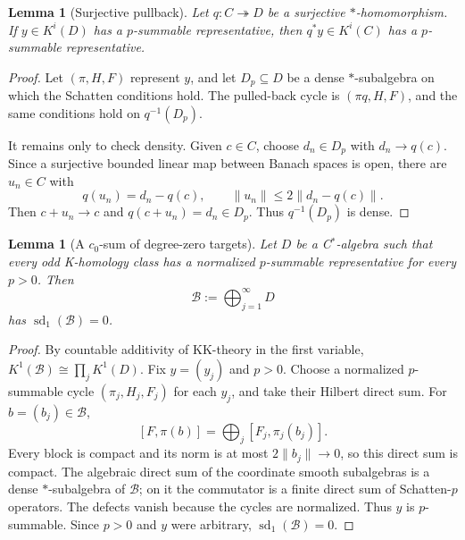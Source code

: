 \documentclass[11pt]{article}
\newtheorem{lemma}[theorem]{Lemma}
\newcommand{\sd}{\operatorname{sd}}
\newcommand{\cB}{\mathcal B}
\begin{document}
\begin{lemma}[Surjective pullback]\label{lem:surj}
Let $q:C\twoheadrightarrow D$ be a surjective $*$-homomorphism.  If
$y\in K^i(D)$ has a $p$-summable representative, then $q^*y\in K^i(C)$ has a
$p$-summable representative.
\end{lemma}

\begin{proof}
Let $(\pi,H,F)$ represent $y$, and let $D_p\subseteq D$ be a dense
$*$-subalgebra on which the Schatten conditions hold.  The pulled-back cycle
is $(\pi q,H,F)$, and the same conditions hold on $q^{-1}(D_p)$.

It remains only to check density.  Given $c\in C$, choose $d_n\in D_p$ with
$d_n\to q(c)$.  Since a surjective bounded linear map between Banach spaces
is open, there are $u_n\in C$ with
\[
 q(u_n)=d_n-q(c),\qquad
 \|u_n\|\le 2\|d_n-q(c)\|.
\]
Then $c+u_n\to c$ and $q(c+u_n)=d_n\in D_p$.  Thus $q^{-1}(D_p)$ is dense.
\end{proof}

\begin{lemma}[A $c_0$-sum of degree-zero targets]\label{lem:c0}
Let $D$ be a C$^*$-algebra such that every odd K-homology class has a
normalized $p$-summable representative for every $p>0$.  Then
\[
 \cB:=\bigoplus_{j=1}^{\infty}D
\]
has $\sd_1(\cB)=0$.
\end{lemma}

\begin{proof}
By countable additivity of KK-theory in the first variable,
$K^1(\cB)\cong\prod_jK^1(D)$.  Fix $y=(y_j)$ and $p>0$.  Choose a normalized
$p$-summable cycle $(\pi_j,H_j,F_j)$ for each $y_j$, and take their Hilbert
direct sum.  For $b=(b_j)\in\cB$,
\[
 [F,\pi(b)]=\bigoplus_j[F_j,\pi_j(b_j)].
\]
Every block is compact and its norm is at most $2\|b_j\|\to0$, so this direct
sum is compact.  The algebraic direct sum of the coordinate smooth
subalgebras is a dense $*$-subalgebra of $\cB$; on it the commutator is a
finite direct sum of Schatten-$p$ operators.  The defects vanish because the
cycles are normalized.  Thus $y$ is $p$-summable.  Since $p>0$ and $y$ were
arbitrary, $\sd_1(\cB)=0$.
\end{proof}
\end{document}
